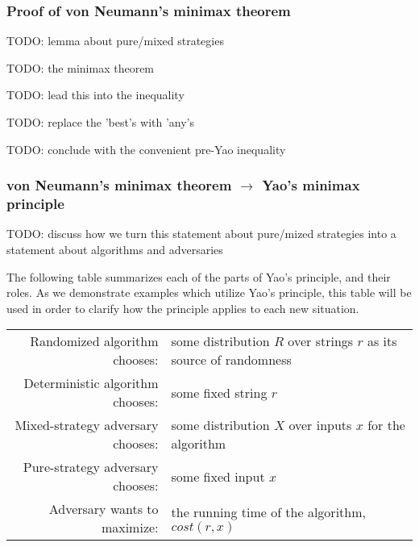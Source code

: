\subsubsection{Proof of von Neumann's minimax theorem}

TODO: lemma about pure/mixed strategies

TODO: the minimax theorem

TODO: lead this into the inequality

TODO: replace the 'best's with 'any's

TODO: conclude with the convenient pre-Yao inequality

\subsubsection{von Neumann's minimax theorem $\longrightarrow$ Yao's minimax principle}

TODO: discuss how we turn this statement about pure/mized strategies into a statement about algorithms and adversaries

The following table summarizes each of the parts of Yao's principle, and their roles. As we demonstrate examples which utilize Yao's principle, this table will be used in order to clarify how the principle applies to each new situation.

\begin{tabular}{r l}
Randomized algorithm chooses: & some distribution $R$ over strings $r$ as its source of randomness
\\
Deterministic algorithm chooses: & some fixed string $r$
\\
Mixed-strategy adversary chooses: & some distribution $X$ over inputs $x$ for the algorithm
\\
Pure-strategy adversary chooses: & some fixed input $x$
\\
Adversary wants to maximize: & the running time of the algorithm, $cost(r,x)$
\end{tabular}
